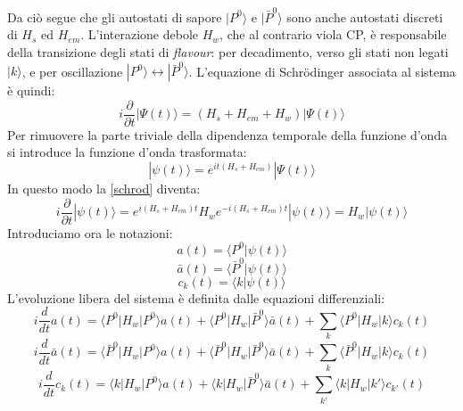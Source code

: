 Da ciò segue che gli autostati di sapore $|P^0\rangle$ e $|\bar{P}^0\rangle$ sono anche autostati discreti di $H_s$ ed $H_{em}$. 
L'interazione debole $H_w$, che al contrario viola CP, è responsabile della transizione 
degli stati di \emph{flavour}: per decadimento, verso gli stati non legati $|k\rangle$, e per oscillazione 
$|P^0\rangle \leftrightarrow |\bar{P}^0\rangle$.
L'equazione di Schr{\"o}dinger associata al sistema è quindi:
\begin{equation}\label{schrod}
 i\frac{\partial}{\partial t}|\Psi(t)\rangle = (H_s + H_{em} + H_w)|\Psi(t)\rangle
\end{equation}
Per rimuovere la parte triviale della dipendenza temporale della funzione d'onda si introduce la funzione d'onda trasformata:
\begin{equation}\label{def}
 |\psi(t)\rangle = e^{it(H_s + H_{em})}|\Psi(t)\rangle
\end{equation}
In questo modo la \eqref{schrod} diventa:
\begin{equation}
 i\frac{\partial}{\partial t} |\psi(t)\rangle = e^{i(H_s + H_{em})t}H_w e^{-i(H_s + H_{em})t}|\psi(t)\rangle = H_w|\psi(t)\rangle
\end{equation}
Introduciamo ora le notazioni:
\begin{equation}
a(t) = \langle P^0|\psi(t)\rangle 
\end{equation}
\begin{equation}
 \bar{a}(t) = \langle \bar{P}^0|\psi(t)\rangle 
\end{equation}
\begin{equation}
c_k(t) = \langle k|\psi(t)\rangle
\end{equation}
L'evoluzione libera del sistema \`e definita dalle equazioni differenziali:
\begin{equation}\label{a}
 i\frac{d}{dt} a(t) = \langle P^0|H_w|P^0\rangle a(t) + \langle P^0|H_w|\bar{P}^0\rangle \bar{a}(t) + \sum_{k} \langle P^0|H_w|k\rangle c_k (t)
\end{equation}
\begin{equation}\label{b}
 i\frac{d}{dt} \bar{a}(t) = \langle \bar{P}^0|H_w|P^0\rangle a(t) + \langle \bar{P}^0|H_w|\bar{P}^0\rangle \bar{a}(t) + \sum_{k} \langle \bar{P}^0|H_w|k\rangle c_k (t)
\end{equation}
\begin{equation}\label{c}
 i\frac{d}{dt} c_k(t) = \langle k|H_w|P^0\rangle a(t) + \langle k|H_w|\bar{P}^0\rangle \bar{a}(t) + \sum_{k'} \langle k|H_w|k'\rangle c_{k'} (t)
\end{equation}
